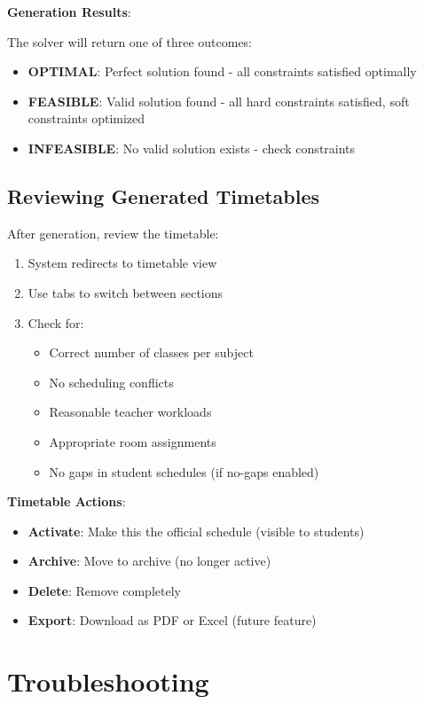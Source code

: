 \documentclass[12pt,a4paper]{article}
\begin{document}
\textbf{Generation Results}:

The solver will return one of three outcomes:

\begin{itemize}
\item \textbf{OPTIMAL}: Perfect solution found - all constraints satisfied optimally
\item \textbf{FEASIBLE}: Valid solution found - all hard constraints satisfied, soft constraints optimized
\item \textbf{INFEASIBLE}: No valid solution exists - check constraints
\end{itemize}

\subsection{Reviewing Generated Timetables}

After generation, review the timetable:

\begin{enumerate}
\item System redirects to timetable view
\item Use tabs to switch between sections
\item Check for:
\begin{itemize}
\item Correct number of classes per subject
\item No scheduling conflicts
\item Reasonable teacher workloads
\item Appropriate room assignments
\item No gaps in student schedules (if no-gaps enabled)
\end{itemize}
\end{enumerate}

\textbf{Timetable Actions}:
\begin{itemize}
\item \textbf{Activate}: Make this the official schedule (visible to students)
\item \textbf{Archive}: Move to archive (no longer active)
\item \textbf{Delete}: Remove completely
\item \textbf{Export}: Download as PDF or Excel (future feature)
\end{itemize}


\section{Troubleshooting}
\end{document}
